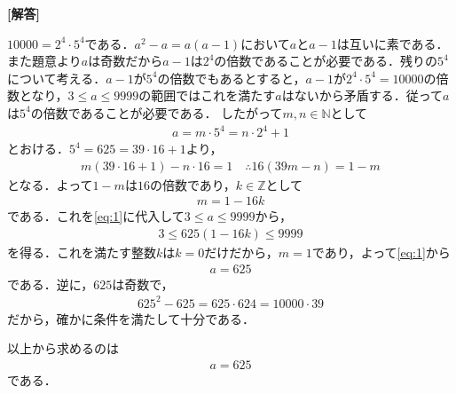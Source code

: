 \documentclass[../../main.tex]{subfiles}
\begin{document}
\begin{oframed}
  
\end{oframed}

{\bf [解答]}

$10000=2^4\cdot5^4$である．$a^2-a=a(a-1)$において$a$と$a-1$は互いに素である．
また題意より$a$は奇数だから$a-1$は$2^4$の倍数であることが必要である．残りの$5^4$について考える．$a-1$が$5^4$の倍数でもあるとすると，$a-1$が$2^4\cdot 5^4=10000$の倍数となり，$3 \le a \le 9999$の範囲ではこれを満たす$a$はないから矛盾する．従って$a$は$5^4$の倍数であることが必要である．
したがって$m,n\in\mathbb N$として
\begin{align}
  a=m\cdot5^4=n\cdot2^4+1 \label{eq:1}
\end{align}
とおける．$5^4=625=39\cdot16+1$より，
\begin{align}
  m(39\cdot16+1)-n\cdot16=1 \quad \therefore 16(39m-n)=1-m \label{eq:2}
\end{align}
となる．よって$1-m$は$16$の倍数であり，$k\in\mathbb Z$として
\begin{align}
  m=1-16k \label{eq:3}
\end{align}
である．これを\cref{eq:1}に代入して$3\le a\le9999$から，
\begin{align}
  3\le 625(1-16k)\le 9999
\end{align}
を得る．これを満たす整数$k$は$k=0$だけだから，$m=1$であり，よって\cref{eq:1}から
\begin{align}
  a=625
\end{align}
である．逆に，$625$は奇数で，
\begin{align}
  625^2-625=625\cdot624=10000\cdot 39
\end{align}
だから，確かに条件を満たして十分である．

以上から求めるのは
\begin{align}
  a = 625
\end{align}
である．
\end{document}
